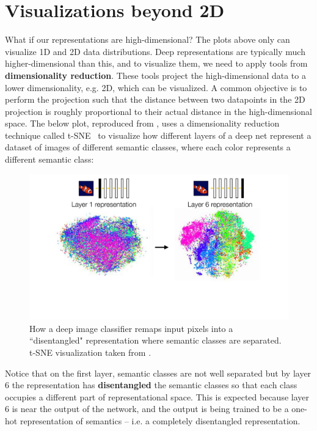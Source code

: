 \section{Visualizations beyond 2D}
What if our representations are high-dimensional? The plots above only can visualize 1D and 2D data distributions. Deep representations are typically much higher-dimensional than this, and to visualize them, we need to apply tools from {\bf dimensionality reduction}. These tools project the high-dimensional data to a lower dimensionality, e.g. 2D, which can be visualized. A common objective is to perform the projection such that the distance between two datapoints in the 2D projection is roughly proportional to their actual distance in the high-dimensional space. The below plot, reproduced from \cite{decaf}, uses a dimensionality reduction technique called t-SNE~\cite{tsne} to visualize how different layers of a deep net represent a dataset of images of different semantic classes, where each color represents a different semantic class:
\begin{figure}[h]
    \centerline{
    \includegraphics[width=0.6\linewidth]{./figures/neural_nets/decaf_tsne.pdf}
    }
    \caption{How a deep image classifier remaps input pixels into a ``disentangled" representation where semantic classes are separated. t-SNE visualization taken from \cite{decaf}. }
    \label{fig:neural_nets:decaf_tsne}
\end{figure}

Notice that on the first layer, semantic classes are not well separated but by layer 6 the representation has {\bf disentangled} the semantic classes so that each class occupies a different part of representational space. This is expected because layer 6 is near the output of the network, and the output is being trained to be a one-hot representation of semantics -- i.e. a completely disentangled representation.

